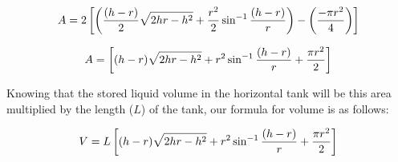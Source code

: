 $$A = 2 \left[ \left( {(h-r) \over 2} \sqrt{2hr - h^2} + {r^2 \over 2} \sin^{-1}{(h-r) \over r} \right) - \left( {-\pi r^2 \over 4} \right)\right]$$

$$A = \left[ (h-r) \sqrt{2hr - h^2} + r^2 \sin^{-1}{(h-r) \over r} + {\pi r^2 \over 2} \right]$$

Knowing that the stored liquid volume in the horizontal tank will be this area multiplied by the length ($L$) of the tank, our formula for volume is as follows:

$$V = L \left[ (h-r) \sqrt{2hr - h^2} + r^2 \sin^{-1}{(h-r) \over r} + {\pi r^2 \over 2} \right]$$




